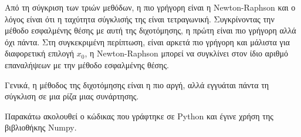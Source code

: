 \documentclass[assignment2.tex]{subfiles}
\begin{document}
Από τη σύγκριση των τριών μεθόδων, η πιο γρήγορη είναι η \textlatin{Newton-Raphson} και ο λόγος είναι ότι η ταχύτητα σύγκλισής της είναι τετραγωνική. Συγκρίνοντας την μέθοδο εσφαλμένης θέσης με αυτή της διχοτόμησης, η πρώτη είναι πιο γρήγορη αλλά όχι πάντα. Στη συγκεκριμένη περίπτωση, είναι αρκετά πιο γρήγορη και μάλιστα για διαφορετική επιλογή $x_0$, η \textlatin{Newton-Raphson} μπορεί να συγκλίνει στον ίδιο αριθμό επαναλήψεων με την μέθοδο εσφαλμένης θέσης. 

Γενικά, η μέθοδος της διχοτόμησης είναι η πιο αργή, αλλά εγγυάται πάντα τη σύγκλιση σε μια ρίζα μιας συνάρτησης.

Παρακάτω ακολουθεί ο κώδικας που γράφτηκε σε \textlatin{Python} και έγινε χρήση της βιβλιοθήκης \textlatin{Numpy}.

\end{document}
